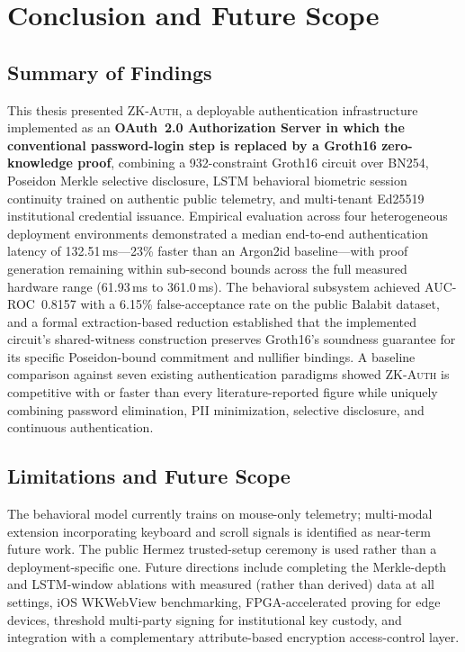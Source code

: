 \documentclass[12pt,a4paper,oneside]{report}
\begin{document}
\chapter{Conclusion and Future Scope}

\section{Summary of Findings}

This thesis presented \textsc{ZK-Auth}, a deployable authentication
infrastructure implemented as an \textbf{OAuth~2.0 Authorization Server
in which the conventional password-login step is replaced by a Groth16
zero-knowledge proof}, combining a 932-constraint Groth16 circuit
over BN254, Poseidon Merkle selective disclosure, LSTM behavioral
biometric session continuity trained on authentic public telemetry, and
multi-tenant Ed25519 institutional credential issuance. Empirical
evaluation across four heterogeneous deployment environments demonstrated
a median end-to-end authentication latency of 132.51\,ms---23\% faster
than an Argon2id baseline---with proof generation remaining within
sub-second bounds across the full measured hardware range (61.93\,ms to
361.0\,ms). The behavioral subsystem achieved AUC-ROC~0.8157 with a
6.15\% false-acceptance rate on the public Balabit dataset, and a formal
extraction-based reduction established that the implemented circuit's
shared-witness construction preserves Groth16's soundness guarantee for
its specific Poseidon-bound commitment and nullifier bindings. A
baseline comparison against seven existing authentication paradigms
showed \textsc{ZK-Auth} is competitive with or faster than every
literature-reported figure while uniquely combining password elimination,
PII minimization, selective disclosure, and continuous authentication.

\section{Limitations and Future Scope}

The behavioral model currently trains on mouse-only telemetry; multi-modal
extension incorporating keyboard and scroll signals is identified as
near-term future work. The public Hermez trusted-setup ceremony is used
rather than a deployment-specific one. Future directions include
completing the Merkle-depth and LSTM-window ablations with measured
(rather than derived) data at all settings, iOS WKWebView benchmarking,
FPGA-accelerated proving for edge devices, threshold multi-party signing
for institutional key custody, and integration with a complementary
attribute-based encryption access-control layer.
\end{document}
